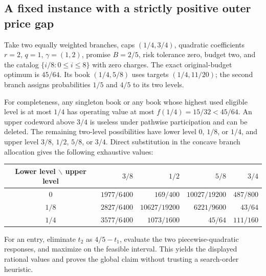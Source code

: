 \subsection{A fixed instance with a strictly positive outer price gap}
Take two equally weighted branches, caps $(1/4,3/4)$, quadratic coefficients $r=2$, $q=1$, $\gamma=(1,2)$, promise $B=2/5$, risk tolerance zero, budget two, and the catalog $\{i/8:0\leq i\leq8\}$ with zero charges. The exact original-budget optimum is $45/64$. Its book $(1/4,5/8)$ uses targets $(1/4,11/20)$; the second branch assigns probabilities $1/5$ and $4/5$ to its two levels.

For completeness, any singleton book or any book whose highest used eligible level is at most $1/4$ has operating value at most $f(1/4)=15/32<45/64$. An upper codeword above $3/4$ is useless under pathwise participation and can be deleted. The remaining two-level possibilities have lower level $0$, $1/8$, or $1/4$, and upper level $3/8$, $1/2$, $5/8$, or $3/4$. Direct substitution in the concave branch allocation gives the following exhaustive values:
\begin{center}\small
\begin{tabular}{c|rrrr}\toprule
Lower level $\backslash$ upper level & $3/8$ & $1/2$ & $5/8$ & $3/4$\\\midrule
$0$ & $1977/6400$ & $169/400$ & $10027/19200$ & $487/800$\\
$1/8$ & $2827/6400$ & $10627/19200$ & $6221/9600$ & $43/64$\\
$1/4$ & $3577/6400$ & $1073/1600$ & $45/64$ & $111/160$\\\bottomrule
\end{tabular}\end{center}
For an entry, eliminate $t_2$ as $4/5-t_1$, evaluate the two piecewise-quadratic responses, and maximize on the feasible interval. This yields the displayed rational values and proves the global claim without trusting a search-order heuristic.

